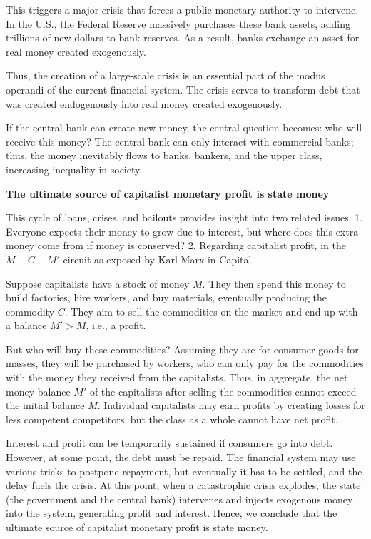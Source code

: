 This triggers a major crisis that forces a public monetary authority to intervene. In the U.S., the Federal Reserve massively purchases these bank assets, adding trillions of new dollars to bank reserves. As a result, banks exchange an asset for real money created exogenously.

Thus, the creation of a large-scale crisis is an essential part of the modus operandi of the current financial system. The crisis serves to transform debt that was created endogenously into real money created exogenously.

If the central bank can create new money, the central question becomes: who will receive this money? The central bank can only interact with commercial banks; thus, the money inevitably flows to banks, bankers, and the upper class, increasing inequality in society.

\textbf{The ultimate source of capitalist monetary profit is state money} 

This cycle of loans, crises, and bailouts provides insight into two related issues:  
1. Everyone expects their money to grow due to interest, but where does this extra money come from if money is conserved?  
2. Regarding capitalist profit, in the $M-C-M'$ circuit as exposed by Karl Marx in Capital.

Suppose capitalists have a stock of money $M$. They then spend this money to build factories, hire workers, and buy materials, eventually producing the commodity $C$. They aim to sell the commodities on the market and end up with a balance $M' > M$, i.e., a profit.


But who will buy these commodities? Assuming they are for consumer goods for masses, they will be purchased by workers, who can only pay for the commodities with the money they received from the capitalists. Thus, in aggregate, the net money balance $M'$ of the capitalists after selling the commodities cannot exceed the initial balance $M$. Individual capitalists may earn profits by creating losses for less competent competitors, but the class as a whole cannot have net profit.

Interest and profit can be temporarily sustained if consumers go into debt. However, at some point, the debt must be repaid. The financial system may use various tricks to postpone repayment, but eventually it has to be settled, and the delay fuels the crisis. At this point, when a catastrophic crisis explodes, the state (the government and the central bank) intervenes and injects exogenous money into the system, generating profit and interest. Hence, we conclude that the ultimate source of capitalist monetary profit is state money.


